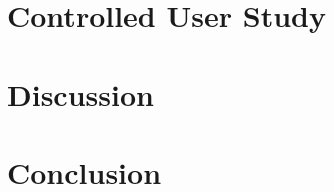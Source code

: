 \documentclass[draft]{IEEEtran}
\begin{document}
\section{Controlled User Study}
\label{sec:study}



\section{Discussion}
\label{sec:discussion}



\section{Conclusion}
\label{sec:conclusion}



\balance




\end{document}
